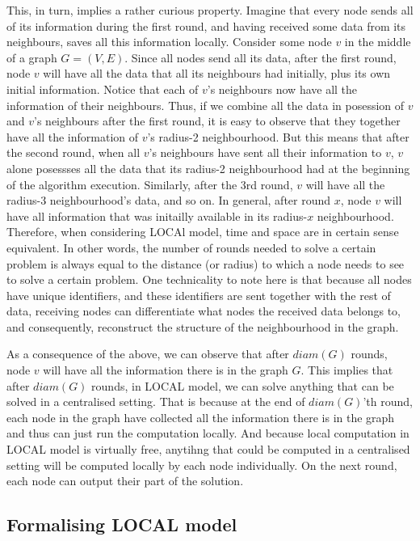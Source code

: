 This, in turn, implies a rather
curious property. Imagine that every node sends all of its information during the first round,
and having received some data from its neighbours, saves all this information locally. Consider
some node $v$ in the middle of a graph $G = (V, E)$. Since all nodes send all its data,
after the first round, node $v$
will have all the data that all its neighbours had initially, plus its own initial information.
Notice that each of $v$'s neighbours now have all the information of their neighbours. Thus,
if we combine all the data in posession of $v$ and $v$'s neighbours after the first round, it
is easy to observe that they together have all the information of $v$'s radius-2 neighbourhood.
But this means that after the second round, when all $v$'s neighbours have sent all their
information to $v$, $v$ alone posessses all the data that its radius-2 neighbourhood had at the
beginning of the algorithm execution. Similarly, after the 3rd round, $v$ will have all the
radius-3 neighbourhood's data, and so on.
In general, after round $x$, node $v$ will have
all information that was initailly available in its radius-$x$ neighbourhood.
Therefore, when considering LOCAl model,
time and space are in certain sense equivalent. In other words, the number of rounds
needed to solve a certain problem is always equal to the distance (or radius) to which a node needs to
see to solve a certain problem. One technicality to note here is that because all nodes have
unique identifiers, and these identifiers are sent together with the rest of data,
receiving nodes can differentiate what nodes the received data belongs to, and consequently,
reconstruct the structure of the neighbourhood in the graph.

As a consequence of the above,
we can observe that after $diam(G)$ rounds, node $v$ will have all the information there is in the 
graph $G$. This implies that after $diam(G)$ rounds, in LOCAL model, we can solve anything that can
be solved in a centralised setting. That is because at the end of $diam(G)$'th round, each node in the
graph have collected all the information there is in the graph and thus can just run the
computation locally. And because local computation in LOCAL model is virtually free,
anytihng that could be computed in a centralised setting will be computed locally by each
node individually. On the next round, each node can output their part of the solution.

\subsection{Formalising LOCAL model}

